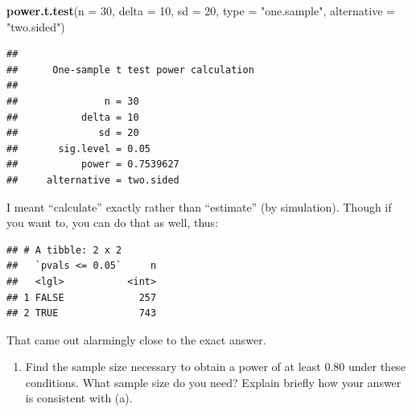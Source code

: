 \documentclass[]{tufte-book}
\newenvironment{Shaded}{}{}
\newcommand{\DataTypeTok}[1]{\textcolor[rgb]{0.56,0.13,0.00}{#1}}
\newcommand{\DecValTok}[1]{\textcolor[rgb]{0.25,0.63,0.44}{#1}}
\newcommand{\FloatTok}[1]{\textcolor[rgb]{0.25,0.63,0.44}{#1}}
\newcommand{\KeywordTok}[1]{\textcolor[rgb]{0.00,0.44,0.13}{\textbf{#1}}}
\newcommand{\NormalTok}[1]{#1}
\newcommand{\OperatorTok}[1]{\textcolor[rgb]{0.40,0.40,0.40}{#1}}
\newcommand{\StringTok}[1]{\textcolor[rgb]{0.25,0.44,0.63}{#1}}
\providecommand{\tightlist}{%
  \setlength{\itemsep}{0pt}\setlength{\parskip}{0pt}}
\theoremstyle{definition}
\theoremstyle{definition}
\theoremstyle{definition}
\theoremstyle{remark}
\begin{document}
\begin{Shaded}
\begin{Highlighting}[]
\KeywordTok{power.t.test}\NormalTok{(}\DataTypeTok{n =} \DecValTok{30}\NormalTok{, }\DataTypeTok{delta =} \DecValTok{10}\NormalTok{, }\DataTypeTok{sd =} \DecValTok{20}\NormalTok{, }\DataTypeTok{type =} \StringTok{"one.sample"}\NormalTok{, }
    \DataTypeTok{alternative =} \StringTok{"two.sided"}\NormalTok{)}
\end{Highlighting}
\end{Shaded}

\begin{verbatim}
## 
##      One-sample t test power calculation 
## 
##               n = 30
##           delta = 10
##              sd = 20
##       sig.level = 0.05
##           power = 0.7539627
##     alternative = two.sided
\end{verbatim}

I meant ``calculate'' exactly rather than ``estimate'' (by simulation).
Though if you want to, you can do that as well, thus:

\begin{Shaded}
\end{Shaded}

\begin{verbatim}
## # A tibble: 2 x 2
##   `pvals <= 0.05`     n
##   <lgl>           <int>
## 1 FALSE             257
## 2 TRUE              743
\end{verbatim}

That came out alarmingly close to the exact answer.

\begin{enumerate}
\def\labelenumi{(\alph{enumi})}
\setcounter{enumi}{1}
\tightlist
\item
  Find the sample size necessary to obtain a power of at least 0.80
  under these conditions. What sample size do you need? Explain briefly
  how your answer is consistent with (a).
\end{enumerate}
\end{document}
